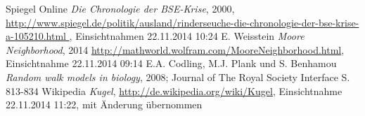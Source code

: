 \documentclass[10pt,twocolumn]{scrartcl}
\begin{document}
\begin{thebibliography}{99}
Spiegel Online {\it Die Chronologie der BSE-Krise}, 2000, \url{
	http://www.spiegel.de/politik/ausland/rinderseuche-die-chronologie-der-bse-krise-a-105210.html
	}, Einsichtnahmen 22.11.2014 10:24
E. Weisstein {\it Moore Neighborhood}, 2014 \url{http://mathworld.wolfram.com/MooreNeighborhood.html}, Einsichtnahme 22.11.2014 09:14
E.A. Codling, M.J. Plank und S. Benhamou {\it Random walk models in biology}, 2008; Journal of The Royal Society Interface S. 813-834
Wikipedia {\it Kugel}, \url{http://de.wikipedia.org/wiki/Kugel}, Einsichtnahme 22.11.2014 11:22, mit Änderung übernommen


\end{thebibliography}
\end{document}
